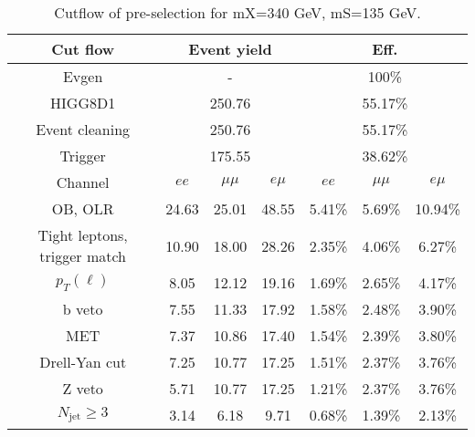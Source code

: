 \begin{table}
\centering\small
\begin{tabular}{c|ccc|ccc}
\hline
\hline
Cut flow &\multicolumn{3}{c|}{Event yield}&\multicolumn{3}{c}{Eff.}      \\
\hline
Evgen&\multicolumn{3}{c|}{-}&\multicolumn{3}{c}{100\%}\\
HIGG8D1&\multicolumn{3}{c|}{250.76}&\multicolumn{3}{c}{55.17\%}\\
Event cleaning&\multicolumn{3}{c|}{250.76}&\multicolumn{3}{c}{55.17\%}\\
Trigger&\multicolumn{3}{c|}{175.55    }&\multicolumn{3}{c}{38.62\%}\\
Channel&$ee$&$\mu\mu$&$e\mu$&$ee$&$\mu\mu$&$e\mu$\\
\hline
OB, OLR    &24.63    &25.01    &48.55& 5.41\%    &5.69\%    &10.94\%\\
Tight leptons, trigger match    &10.90    &18.00    &28.26    &2.35\%    &4.06\%    &6.27\%\\
$p_T(\ell)$    &8.05    &12.12    &19.16    &1.69\%    &2.65\%    &4.17\%\\
b veto    &7.55    &11.33    &17.92    &1.58\%    &2.48\%    &3.90\%\\
MET    &7.37    &10.86    &17.40    &1.54\%    &2.39\%    &3.80\%\\
Drell-Yan cut    &7.25    &10.77    &17.25    &1.51\%    &2.37\%    &3.76\%\\
Z veto    &5.71    &10.77    &17.25    &1.21\%    &2.37\%    &3.76\%\\
$N_{\text{jet}}\geq3$    &3.14    &6.18    &9.71    &0.68\%    &1.39\%    &2.13\%\\
\hline
\hline
\end{tabular}
\caption{Cutflow of pre-selection for mX=340 GeV, mS=135 GeV.}
\label{tab:cut_flow_preselection_mX260}
\end{table}
